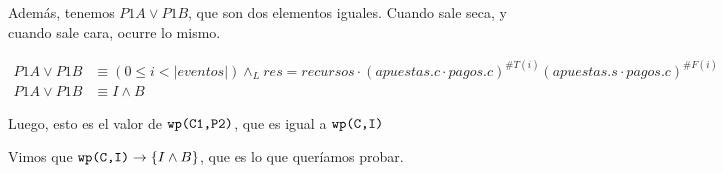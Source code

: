 \documentclass[../document.tex]{subfiles}
\begin{document}

Además, tenemos $P1A \lor P1B$, que son dos elementos iguales. Cuando sale seca, y cuando sale cara, ocurre lo mismo. 

\begin{align*}
    P1A \lor P1B &\equiv
    (0\leq i < |eventos|)\land_{L}
    res = recursos \cdot (apuestas.c\cdot pagos.c)^{\#T(i)}(apuestas.s\cdot pagos.c)^{\#F(i)}\\
    P1A \lor P1B &\equiv I \land B
\end{align*}

Luego, esto es el valor de $\verb+wp(C1,P2)+$, que es igual a $\verb+wp(C,I)+$

Vimos que $\verb+wp(C,I)+ \to \{I \land B\}$, que es lo que queríamos probar.
\end{document}
